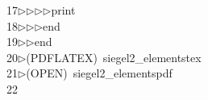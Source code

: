 \begin{tabbing}
17\>$\triangleright$\>$\triangleright$\>$\triangleright$\>$\triangleright$\>print\ \\[0pt]
18\>$\triangleright$\>$\triangleright$\>$\triangleright$\>end\ \\[0pt]
19\>$\triangleright$\>$\triangleright$\>end\\[0pt]
20\>$\triangleright$\>(PDFLATEX)\ siegel2\_elementstex\\[0pt]
21\>$\triangleright$\>(OPEN)\ siegel2\_elementspdf\\[0pt]
22\>\end{tabbing}
